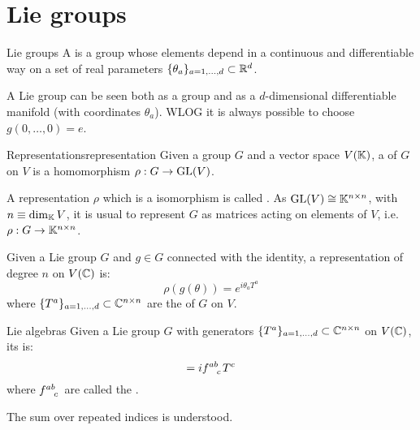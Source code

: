 
\section{Lie groups}

\begin{definition}{Lie groups}{}
  A  is a group whose elements depend in a continuous and differentiable way on a set of real parameters $ \{\theta_a\}_{a = 1, \dots, d} \subset \mathbb{R}^d $.
\end{definition}

A Lie group can be seen both as a group and as a $ d $-dimensional differentiable manifold (with coordinates $ \theta_a $). WLOG it is always possible to choose $ g(0,\dots,0) = e $.

\begin{definition}{Representations}{representation}
  Given a group $ G $ and a vector space $ V(\mathbb{K}) $, a  of $ G $ on $ V $ is a homomorphism $ \rho : G \rightarrow \mathrm{GL}(V) $.
\end{definition}

A representation $ \rho $ which is a isomorphism is called . As $ \mathrm{GL}(V) \cong \mathbb{K}^{n \times n} $, with $ n \equiv \dim_{\mathbb{K}} V $, it is usual to represent $ G $ as matrices acting on elements of $ V $, i.e. $ \rho : G \rightarrow \mathbb{K}^{n \times n} $.

\begin{theorem}{}{}
  Given a Lie group $ G $ and $ g \in G $ connected with the identity, a representation of degree $ n $ on $ V(\mathbb{C}) $ is:
  \begin{equation}
    \rho(g(\theta)) = e^{i \theta_a T^a}
  \end{equation}
  where $ \{T^a\}_{a = 1, \dots, d} \subset \mathbb{C}^{n \times n} $ are the  of $ G $ on $ V $.
\end{theorem}

\begin{definition}{Lie algebras}{}
  Given a Lie group $ G $ with generators $ \{T^a\}_{a = 1, \dots, d} \subset \mathbb{C}^{n \times n} $ on $ V(\mathbb{C}) $, its  is:
  \begin{equation}
    [T^a, T^b] = i \tensor{f}{^a^b_c} T^c
  \end{equation}
  where $ \tensor{f}{^a^b_c} $ are called the .
\end{definition}

The sum over repeated indices is understood.

